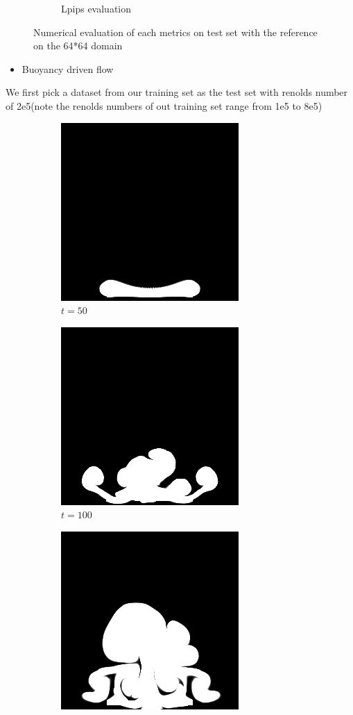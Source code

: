 \documentclass[a4paper,12pt,twoside]{report}
\begin{document}
\begin{figure}
\begin{subfigure}{0.32\textwidth}
		\caption{Lpips evaluation}
	\end{subfigure}
	\caption{Numerical evaluation of each metrics on test set with the reference on the 64*64 domain}
\end{figure}

\begin{itemize}
  \item Buoyancy driven flow
\end{itemize}
We first pick a dataset from our training set as the test set with renolds number of 2e5(note the renolds numbers of out training set range from 1e5 to 8e5)
\begin{figure}
\centering
\begin{subfigure}{0.18\textwidth}
  \centering
  \includegraphics[scale=0.28]{buoyancy/dens_000050_ref.png}
  \caption{$t=50$}
\end{subfigure}
\begin{subfigure}{0.18\textwidth}
  \centering
  \includegraphics[scale=0.28]{buoyancy/dens_000100_ref.png}
  \caption{$t=100$}
\end{subfigure}
\begin{subfigure}{0.18\textwidth}
  \centering
  \includegraphics[scale=0.28]{buoyancy/dens_000150_ref.png}

\end{subfigure}
\end{figure}
\end{document}

